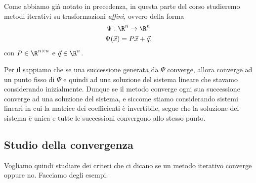 Come abbiamo già notato in precedenza, in questa parte del corso studieremo metodi iterativi su trasformazioni \emph{affini}, ovvero della forma \begin{gather*}
    \Psi : \R^n \to \R^n\\
    \Psi(\vec x) = P\vec x + \vec q,
\end{gather*} con $P \in \Mat{\R, n, n}$ e $\vec q \in \R^n$. 

Per il  sappiamo che se una successione generata da $\Psi$ converge, allora converge ad un punto fisso di $\Psi$ e quindi ad una soluzione del sistema lineare che stavamo considerando inizialmente. 
Dunque se il metodo converge ogni sua successione converge ad una soluzione del sistema, e siccome stiamo considerando sistemi lineari in cui la matrice dei coefficienti è invertibile, segue che la soluzione del sistema è unica e tutte le successioni convergono allo stesso punto.

\subsection{Studio della convergenza}

Vogliamo quindi studiare dei criteri che ci dicano se un metodo iterativo converge oppure no. Facciamo degli esempi.

